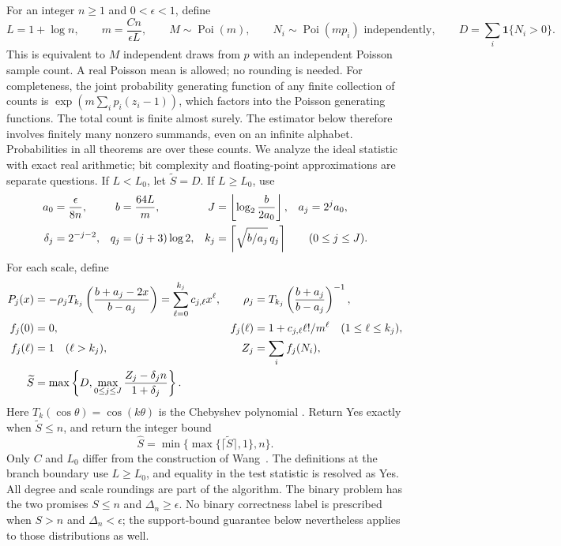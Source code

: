\documentclass[10pt]{article}
\newcommand{\Poi}{\operatorname{Poi}}
\newcommand{\ind}{\mathbf 1}
\begin{document}
For an integer $n\ge1$ and $0<\epsilon<1$, define
\begin{equation}\label{eq:model}
 L=1+\log n,\qquad m=\frac{Cn}{\epsilon L},\qquad
 M\sim\Poi(m),\qquad N_i\sim\Poi(mp_i)\text{ independently},\qquad
 D=\sum_i\ind\{N_i>0\}.
\end{equation}
This is equivalent to $M$ independent draws from $p$ with an independent
Poisson sample count. A real Poisson mean is allowed; no rounding is needed.
For completeness, the joint probability generating function of any finite
collection of counts is
$\exp(m\sum_i p_i(z_i-1))$, which factors into the Poisson generating
functions. The total count is finite almost surely. The estimator below
therefore involves finitely many nonzero summands, even on an infinite
alphabet. Probabilities in all theorems are over these counts. We analyze
the ideal statistic with exact real arithmetic; bit complexity and
floating-point approximations are separate questions.
If $L<L_0$, let $\widetilde S=D$. If $L\ge L_0$, use
\begin{align}
 a_0&=\frac{\epsilon}{8n},& b&=\frac{64L}{m},&
 J&=\left\lfloor\log_2\frac{b}{2a_0}\right\rfloor,
 &a_j&=2^ja_0,\label{eq:parameters}\\
 \delta_j&=2^{-j-2},&q_j&=(j+3)\log2,&
 k_j&=\left\lceil\sqrt{b/a_j}\,q_j\right\rceil
 &&(0\le j\le J).\notag
\end{align}
For each scale, define
\begin{align}
 P_j(x)&=-\rho_j T_{k_j}\left(\frac{b+a_j-2x}{b-a_j}\right)
       =\sum_{\ell=0}^{k_j}c_{j,\ell}x^\ell,
 &\rho_j&=T_{k_j}\left(\frac{b+a_j}{b-a_j}\right)^{-1},\label{eq:weights}\\
 f_j(0)&=0,&f_j(\ell)&=1+c_{j,\ell}\ell!/m^\ell\quad(1\le\ell\le k_j),\notag\\
 f_j(\ell)&=1\quad(\ell>k_j),&Z_j&=\sum_i f_j(N_i),\notag\\
 \widetilde S&=\max\left\{D,\max_{0\le j\le J}
                    \frac{Z_j-\delta_j n}{1+\delta_j}\right\}.
 \label{eq:statistic}
\end{align}
Here $T_k(\cos\theta)=\cos(k\theta)$ is the Chebyshev polynomial
\cite[18.5.1]{dlmf}.
Return Yes exactly when $\widetilde S\le n$, and return the integer bound
\begin{equation}\label{eq:output}
 \widehat S=\min\{\max\{\lceil\widetilde S\rceil,1\},n\}.
\end{equation}
Only $C$ and $L_0$ differ from the construction of Wang~\cite[Section 3]{wang}.
The definitions at the branch boundary use $L\ge L_0$, and equality in the
test statistic is resolved as Yes. All degree and scale roundings are part
of the algorithm.
The binary problem has the two promises $S\le n$ and $\Delta_n\ge\epsilon$.
No binary correctness label is prescribed when $S>n$ and
$\Delta_n<\epsilon$; the support-bound guarantee below nevertheless applies
to those distributions as well.
\end{document}
